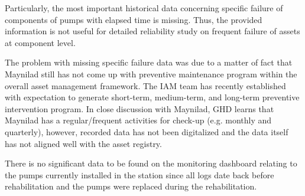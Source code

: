 Particularly, the most important historical data concerning specific failure of components of pumps with elapsed time is missing. Thus, the provided information is not useful for detailed reliability study on frequent failure of assets at component level. 

The problem with missing specific failure data was due to a matter of fact that Maynilad still has not come up with preventive maintenance program within the overall asset management framework. The IAM team has recently established with expectation to generate short-term, medium-term, and long-term preventive intervention program. In close discussion with Maynilad, GHD learns that Maynilad has a regular/frequent activities for check-up (e.g. monthly and quarterly), however, recorded data has not been digitalized and the data itself has not aligned well with the asset registry. 

There is no significant data to be found on the monitoring dashboard relating to the pumps currently installed in the station since all logs date back before rehabilitation and the pumps were replaced during the rehabilitation. 

